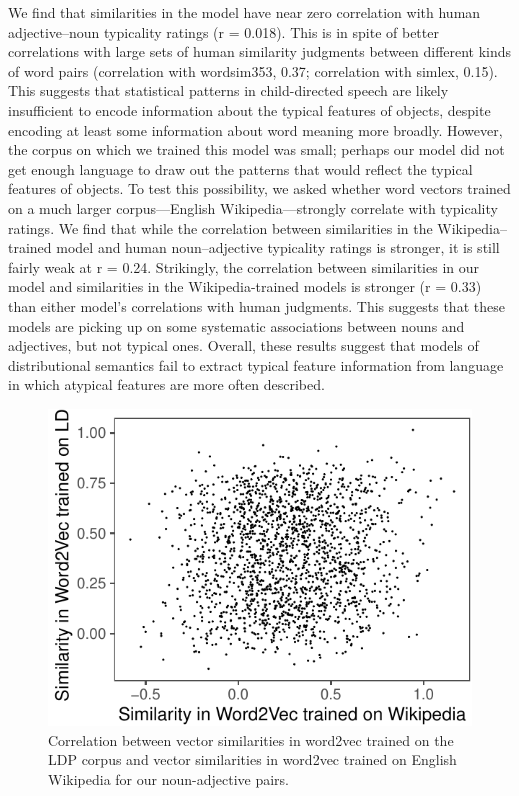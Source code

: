 \documentclass[10pt, letterpaper]{article}
\newenvironment{CodeChunk}{}{}
\begin{document}
We find that similarities in the model have near zero correlation with
human adjective--noun typicality ratings (r = 0.018). This is in spite
of better correlations with large sets of human similarity judgments
between different kinds of word pairs (correlation with wordsim353,
0.37; correlation with simlex, 0.15). This suggests that statistical
patterns in child-directed speech are likely insufficient to encode
information about the typical features of objects, despite encoding at
least some information about word meaning more broadly. However, the
corpus on which we trained this model was small; perhaps our model did
not get enough language to draw out the patterns that would reflect the
typical features of objects. To test this possibility, we asked whether
word vectors trained on a much larger corpus---English
Wikipedia---strongly correlate with typicality ratings. We find that
while the correlation between similarities in the Wikipedia--trained
model and human noun--adjective typicality ratings is stronger, it is
still fairly weak at r = 0.24. Strikingly, the correlation between
similarities in our model and similarities in the Wikipedia-trained
models is stronger (r = 0.33) than either model's correlations with
human judgments. This suggests that these models are picking up on some
systematic associations between nouns and adjectives, but not typical
ones. Overall, these results suggest that models of distributional
semantics fail to extract typical feature information from language in
which atypical features are more often described.

\begin{CodeChunk}
\begin{figure}[tb]

{\centering \includegraphics{figs/word2vec2-1} 

}

\caption[Correlation between vector similarities in word2vec trained on the LDP corpus and vector similarities in word2vec trained on English Wikipedia for our noun-adjective pairs]{Correlation between vector similarities in word2vec trained on the LDP corpus and vector similarities in word2vec trained on English Wikipedia for our noun-adjective pairs.}\label{fig:word2vec2}
\end{figure}
\end{CodeChunk}
\end{document}
